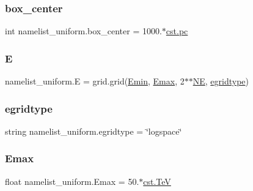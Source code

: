 \subsubsection{\texorpdfstring{box\+\_\+center}{box\_center}}
{\footnotesize\ttfamily int namelist\+\_\+uniform.\+box\+\_\+center = 1000.$\ast$\hyperlink{constants_8h_a2884cd030c4c825754349a525a1d06ce}{cst.\+pc}}

\mbox{\label{namespacenamelist__uniform_ae326a4c58a1bf2113624ca242b164c87}} 
\subsubsection{\texorpdfstring{E}{E}}
{\footnotesize\ttfamily namelist\+\_\+uniform.\+E = grid.\+grid(\hyperlink{namespacenamelist__uniform_a32b39233fb12d5ffbaa3a950a1286f88}{Emin}, \hyperlink{namespacenamelist__uniform_aea587487093a8523b1e57e0eba597155}{Emax}, 2$\ast$$\ast$\hyperlink{namespacenamelist__uniform_a9a7501e0271bf9c456a9be1b666c1018}{NE}, \hyperlink{namespacenamelist__uniform_a09d1021139053cd3ea6f5263f08b418a}{egridtype})}

\mbox{\label{namespacenamelist__uniform_a09d1021139053cd3ea6f5263f08b418a}} 
\subsubsection{\texorpdfstring{egridtype}{egridtype}}
{\footnotesize\ttfamily string namelist\+\_\+uniform.\+egridtype = \char`\"{}logspace\char`\"{}}

\mbox{\label{namespacenamelist__uniform_aea587487093a8523b1e57e0eba597155}} 
\subsubsection{\texorpdfstring{Emax}{Emax}}
{\footnotesize\ttfamily float namelist\+\_\+uniform.\+Emax = 50.$\ast$\hyperlink{constants_8h_a7f801e1f6821bc6baf0652ed2496e5e9}{cst.\+TeV}}

